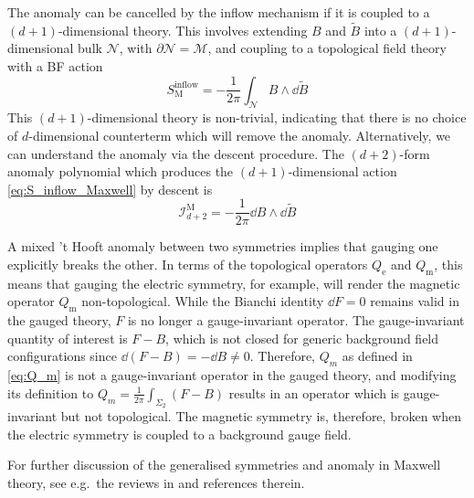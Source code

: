 The anomaly can be cancelled by the inflow mechanism if it is coupled to a $(d+1)$-dimensional theory. This involves extending $B$ and $\tilde{B}$ into a $(d+1)$-dimensional bulk $\mathcal{N}$, with $\partial\mathcal{N} = \mathcal{M}$, and coupling to a topological field theory with a BF action
\begin{equation}\label{eq:S_inflow_Maxwell}
    S_{\text{M}}^{\text{inflow}} = -\frac{1}{2\pi} \int_{\mathcal{N}} B \wedge \dd\tilde{B}
\end{equation}
This $(d+1)$-dimensional theory is non-trivial, indicating that there is no choice of $d$-dimensional counterterm which will remove the anomaly. 
Alternatively, we can understand the anomaly via the descent procedure. The $(d+2)$-form anomaly polynomial which produces the $(d+1)$-dimensional  action \eqref{eq:S_inflow_Maxwell} by descent is 
\begin{equation}\label{eq:anomaly_poly_maxwell}
    \mathcal{I}_{d+2}^{\text{M}} = -\frac{1}{2\pi} \dd{B} \wedge \dd{\tilde{B}}
\end{equation}

A mixed 't Hooft anomaly between two symmetries implies that gauging one explicitly breaks the other. In terms of the topological operators $Q_\text{e}$ and $Q_\text{m}$, this means that gauging the electric symmetry, for example, will render the magnetic operator $Q_\text{m}$ non-topological. 
While the Bianchi identity $\dd{F}=0$ remains valid in the gauged theory, $F$ is no longer a gauge-invariant operator. The gauge-invariant quantity of interest is $F-B$, which is not closed for generic background field configurations since $\dd{(F-B)} = -\dd{B} \neq0$. Therefore, $Q_m$ as defined in \eqref{eq:Q_m} is not a gauge-invariant operator in the gauged theory, and modifying its definition to $Q_m = \frac{1}{2\pi} \int_{\Sigma_2} (F-B)$ results in an operator which is gauge-invariant but not topological. The magnetic symmetry is, therefore, broken when the electric symmetry is coupled to a background gauge field. 

For further discussion of the generalised symmetries and anomaly in Maxwell theory, see e.g.\ the reviews in \cite{Hofman:2017vwr, Brennan:2023mmt, Schafer-Nameki:2023jdn, Bhardwaj:2023kri} and references therein.